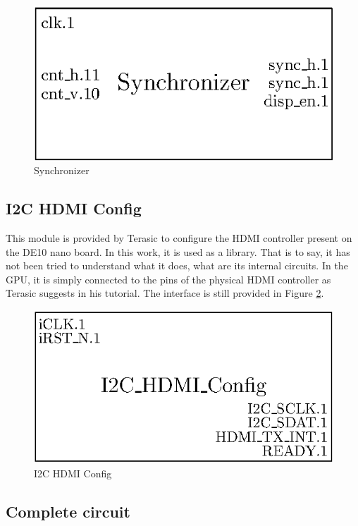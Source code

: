 \begin{figure}[H]
    \centering
    \includegraphics[scale=1.0]{Chapter4-GPU_CLKU/res/synchronizer}
    \caption{Synchronizer}
    \label{fig:gpu/synchronizer}
\end{figure}

\subsection{I2C HDMI Config}

This module is provided by Terasic to configure the HDMI controller present on the DE10 nano board. 
In this work, it is used as a library. That is to say, it has not been tried to understand what it 
does, what are its internal circuits. In the GPU, it is simply connected to the pins of the physical
HDMI controller as Terasic suggests in his tutorial. The interface is still provided in 
Figure \ref{fig:gpu/i2c}.

\begin{figure}[H]
    \centering
    \includegraphics[scale=0.8]{Chapter4-GPU_CLKU/res/i2c}
    \caption{I2C HDMI Config}
    \label{fig:gpu/i2c}
\end{figure}

\subsection{Complete circuit}

